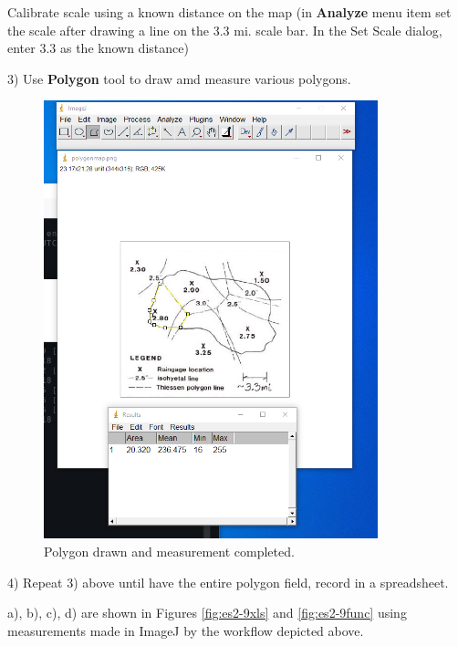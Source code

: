 \documentclass[12pt]{article}
\begin{document}
\begin{enumerate}
Calibrate scale using a known distance on the map (in \textbf{Analyze} menu item set the scale after drawing a line on the 3.3 mi. scale bar.  In the Set Scale dialog, enter 3.3 as the known distance)

3) Use \textbf{Polygon} tool to draw amd measure various polygons.  

\begin{figure}[h!] %
   \centering
   \includegraphics[height=5in]{polymeasure1.png} 
   \caption{Polygon drawn and measurement completed.}
   \label{fig:polymeasure1}
\end{figure}
\clearpage

4) Repeat 3) above until have the entire polygon field, record in a spreadsheet.

a), b), c), d) are shown in Figures \ref{fig:es2-9xls} and \ref{fig:es2-9func} using measurements made in ImageJ by the workflow depicted above.


\end{enumerate}
\end{document}
